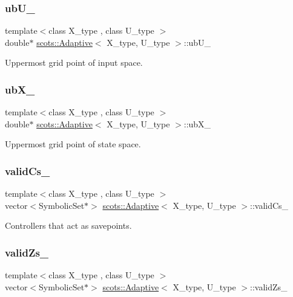 \subsubsection{\texorpdfstring{ub\+U\+\_\+}{ubU\_}}
{\footnotesize\ttfamily template$<$class X\+\_\+type , class U\+\_\+type $>$ \\
double$\ast$ \hyperlink{classscots_1_1Adaptive}{scots\+::\+Adaptive}$<$ X\+\_\+type, U\+\_\+type $>$\+::ub\+U\+\_\+}

Uppermost grid point of input space. \mbox{\label{classscots_1_1Adaptive_ac50c58c4495d727acdb321a0b995426b}} 
\subsubsection{\texorpdfstring{ub\+X\+\_\+}{ubX\_}}
{\footnotesize\ttfamily template$<$class X\+\_\+type , class U\+\_\+type $>$ \\
double$\ast$ \hyperlink{classscots_1_1Adaptive}{scots\+::\+Adaptive}$<$ X\+\_\+type, U\+\_\+type $>$\+::ub\+X\+\_\+}

Uppermost grid point of state space. \mbox{\label{classscots_1_1Adaptive_ad470ad33182f03ad7b3dd5fe9e5271d5}} 
\subsubsection{\texorpdfstring{valid\+Cs\+\_\+}{validCs\_}}
{\footnotesize\ttfamily template$<$class X\+\_\+type , class U\+\_\+type $>$ \\
vector$<$Symbolic\+Set$\ast$$>$ \hyperlink{classscots_1_1Adaptive}{scots\+::\+Adaptive}$<$ X\+\_\+type, U\+\_\+type $>$\+::valid\+Cs\+\_\+}

Controllers that act as savepoints. \mbox{\label{classscots_1_1Adaptive_af160394c89efaa08d8830a1df066586d}} 
\subsubsection{\texorpdfstring{valid\+Zs\+\_\+}{validZs\_}}
{\footnotesize\ttfamily template$<$class X\+\_\+type , class U\+\_\+type $>$ \\
vector$<$Symbolic\+Set$\ast$$>$ \hyperlink{classscots_1_1Adaptive}{scots\+::\+Adaptive}$<$ X\+\_\+type, U\+\_\+type $>$\+::valid\+Zs\+\_\+}


